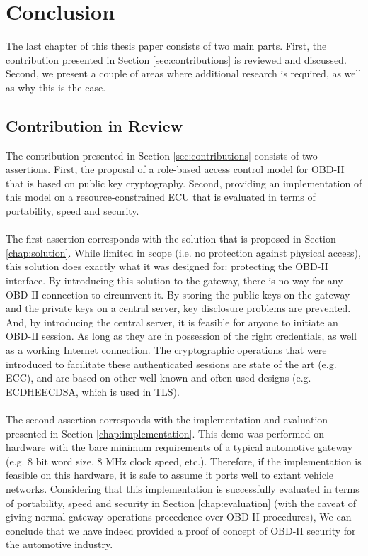 
\chapter{Conclusion}
\label{chap:conclusion}

The last chapter of this thesis paper consists of two main parts. First, the contribution presented in Section \ref{sec:contributions} is reviewed and discussed. Second, we present a couple of areas where additional research is required, as well as why this is the case.

\section{Contribution in Review}
\label{sec:contribution_in_review}

The contribution presented in Section \ref{sec:contributions} consists of two assertions. First, the proposal of a role-based access control model for OBD-II that is based on public key cryptography. Second, providing an implementation of this model on a resource-constrained ECU that is evaluated in terms of portability, speed and security. \\ \\ The first assertion corresponds with the solution that is proposed in Section \ref{chap:solution}. While limited in scope (i.e. no protection against physical access), this solution does exactly what it was designed for: protecting the OBD-II interface. By introducing this solution to the gateway, there is no way for any OBD-II connection to circumvent it. By storing the public keys on the gateway and the private keys on a central server, key disclosure problems are prevented. And, by introducing the central server, it is feasible for anyone to initiate an OBD-II session. As long as they are in possession of the right credentials, as well as a working Internet connection. The cryptographic operations that were introduced to facilitate these authenticated sessions are state of the art (e.g. ECC), and are based on other well-known and often used designs (e.g. ECDHE\textunderscore ECDSA, which is used in TLS). \\ \\ The second assertion corresponds with the implementation and evaluation presented in Section \ref{chap:implementation}. This demo was performed on hardware with the bare minimum requirements of a typical automotive gateway (e.g. 8 bit word size, 8 MHz clock speed, etc.). Therefore, if the implementation is feasible on this hardware, it is safe to assume it ports well to extant vehicle networks. Considering that this implementation is successfully evaluated in terms of portability, speed and security in Section \ref{chap:evaluation} (with the caveat of giving normal gateway operations precedence over OBD-II procedures), We can conclude that we have indeed provided a proof of concept of OBD-II security for the automotive industry.

